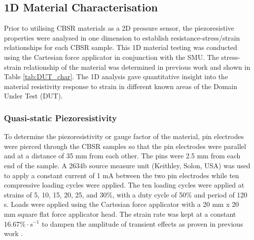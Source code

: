 

\subsection{1D Material Characterisation} \label{sec:1D Material Characterisation}
Prior to utilising CBSR materials as a 2D pressure sensor, the piezoresistive properties were analysed in one dimension to establish resistance-stress/strain relationships for each CBSR sample. This 1D material testing was conducted using the Cartesian force applicator in conjunction with the SMU. The stress-strain relationship of the material was determined in previous work and shown in Table \ref{tab:DUT_char}. The 1D analysis gave quantitative insight into the material resistivity response to strain in different known areas of the Domain Under Test (DUT). 

\subsubsection{Quasi-static Piezoresistivity}\label{sec:Quasi-static Piezoresistivity}
 To determine the piezoresistivity or gauge factor of the material, pin electrodes were pierced through the CBSR samples so that the pin electrodes were parallel and at a distance of 35 mm from each other. The pins were 2.5 mm from each end of the sample. A 2634b source measure unit (Keithley, Solon, USA) was used to apply a constant current of 1 mA between the two pin electrodes while ten compressive loading cycles were applied. The ten loading cycles were applied at strains of 5, 10, 15, 20, 25, and 30\%, with a duty cycle of 50\% and period of 120 s. Loads were applied using the Cartesian force applicator with a 20 mm x 20 mm square flat force applicator head. The strain rate was kept at a constant 16.67$\% \cdot s^{-1}$ to dampen the amplitude of transient effects as proven in previous work \citep{Ellingham2021}.

